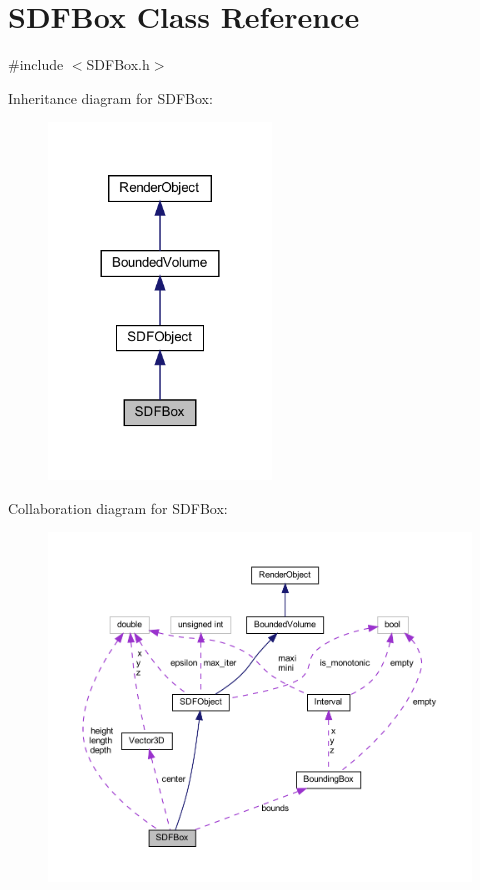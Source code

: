 \hypertarget{classSDFBox}{}\section{S\+D\+F\+Box Class Reference}
\label{classSDFBox}


{\ttfamily \#include $<$S\+D\+F\+Box.\+h$>$}



Inheritance diagram for S\+D\+F\+Box\+:
\nopagebreak
\begin{figure}[H]
\begin{center}
\leavevmode
\includegraphics[width=168pt]{classSDFBox__inherit__graph}
\end{center}
\end{figure}


Collaboration diagram for S\+D\+F\+Box\+:
\nopagebreak
\begin{figure}[H]
\begin{center}
\leavevmode
\includegraphics[width=350pt]{classSDFBox__coll__graph}
\end{center}
\end{figure}
